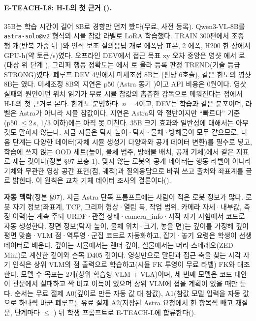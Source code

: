 \paragraph{E-TEACH-L8: H-L의 첫 근거 ().} 35B는 학습 시간이 길어 8B로 경향만 먼저 봤다(무료, 사전 등록). Qwen3-VL-8B를 \texttt{astra-solo@v2} 형식의 시뮬 참값 라벨로 LoRA 학습했다. TRAIN 300편에서 조종 행 개(반복 가중 뒤 )와 인식 보조 질의응답 개로 에폭당  표본, 2 에폭, H200 한 장에서  GPU-h(약  토큰/s)였다. 오프라인 DEV에서 접근 목표 xy 오차 중앙은 영샷 에서 로(대상 위 단계 ), 그리퍼 행동 정확도는 에서 로 올라 등록 판정 TREND(기술 등급 STRONG)였다. 폐루프 DEV 4편에서 미세조정 8B는 (편당 6호출), 같은 한도의 영샷 8B는 였다. 미세조정 8B의 지연은 p50 (Astra 동기 )이고 API 비용은 0원이다. 영샷 실패의 원인이던 위치 읽기가 무료 시뮬 참값의 촘촘한 감독으로 메워진다는 점에서 H-L의 첫 근거로 본다. 한계도 분명하다. $n=4$이고, DEV는 학습과 같은 분포이며, 라벨은 Astra가 아니라 시뮬 참값이다. 지연은 Astra의 약 절반이지만 ``빠르다'' 기준(p50 $\le$2\,s, 1/3 이하)에는 아직 못 미친다. 35B 크기 효과와 일반성에 대해서는 아무것도 말하지 않는다. 지금 시뮬은 탁자 높이·탁자·물체·방해물이 모두 같으므로, 다음 단계는 다양한 데이터(자체 시뮬 생성기 다양화와 공개 데이터 변환)를 필수로 넣고, 학습에 쓰지 않는 OOD 세트(높이, 물체 범주, 방해물 배치, 공개 기체)에서 같은 지표로 재는 것이다(정본 §97 보충 1). 맞지 않는 로봇의 공개 데이터는 행동 라벨이 아니라 기체와 무관한 영상 공간 표현(점, 궤적)과 질의응답으로 바꿔 쓰고 출처와 좌표계를 글로 밝힌다. 이 원칙은 교차 기체 데이터 조사의 결론이다().

\textbf{자동 맥락}(정본 §97). 지금 Astra 단독 프롬프트에는 사람이 적은 로봇 정보가 많다. 로봇 자기 정보(좌표계, TCP, 그리퍼 형상·열림 폭, 작업 범위, 카메라 자세·내부값, 측정 이력)는 계속 주되 URDF·관절 상태·camera\_info·시작 자기 시험에서 코드로 자동 생성한다. 장면 정보(탁자 높이, 물체 위치·크기, 놓을 면)는 깊이를 가정해 깊이 평면 맞춤·VLM 점·역투영·군집 코드로 자동화하고, 잡기·놓기 요령은 학생이 선생 데이터로 배운다. 깊이는 시뮬에서는 렌더 깊이, 실물에서는 머리 스테레오(ZED Mini)로 계산한 깊이와 손목 D405 깊이다. 영상만으로 말단과 접근 축을 찾는 시각 자기 인식은 상위 VLM의 점 출력으로 학습하고(시뮬 FK 투영이 무료 라벨) FK와 대조한다. 모델 수 목표는 2개(상위 학습형 VLM + VLA)이며, 세 번째 모델은 코드 대안이 관문에서 실패하고 짝 비교 이득이 있으며 상위 VLM에 접을 계획이 있을 때만 둔다. 순서는 무료 절제 A0(깊이로 만든 자동 값 대 참값), A1(참값 모델 입력을 자동 값으로 하나씩 바꾼 폐루프), 유료 절제 A2(저장된 Astra 요청에서 한 항목씩 빼고 재질문, 단계마다 $\le$ ) 뒤 학생 프롬프트로 E-TEACH-L에 합류한다().

